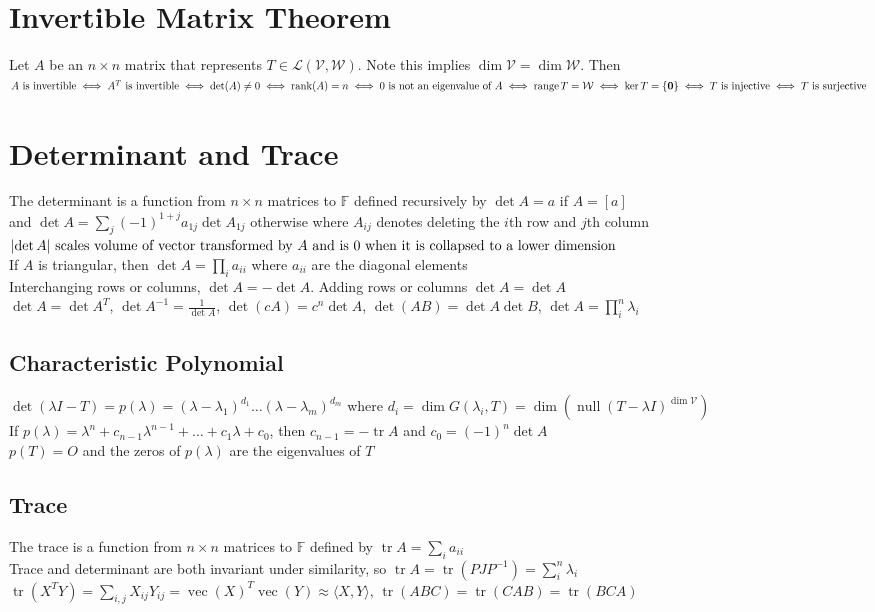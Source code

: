 \documentclass{article}
\DeclarePairedDelimiter\abs{\lvert}{\rvert}%
\DeclareMathOperator{\rank}{rank}
\DeclareMathOperator{\range}{range}
\DeclareMathOperator{\nullspace}{null}
\DeclareMathOperator{\tr}{tr}
\DeclareMathOperator{\vect}{vec}
\newcommand{\F}{\mathbb{F}}
\newcommand{\linear}{\mathcal{L}}
\newcommand{\V}{\mathcal{V}}
\newcommand{\W}{\mathcal{W}}
\newcommand\inner[2]{\langle #1, #2 \rangle}
\begin{document}
\section{Invertible Matrix Theorem}
Let $A$ be an $n \times n$ matrix that represents $T \in \linear(\V, \W)$. Note this implies $\dim \V = \dim \W$. Then \\
$A \mbox{ is invertible} \iff A^T \mbox{ is invertible} \iff \det(A) \neq 0 \iff \rank(A) = n \iff 0 \mbox{ is not an eigenvalue of } A \\ \iff \range T = \W \iff \ker T = \{ \boldsymbol{0} \} \iff T \mbox{ is injective} \iff T \mbox{ is surjective}$

\section{Determinant and Trace}
The determinant is a function from $n \times n$ matrices to $\F$ defined recursively by $\det A = a$ if $A = [a]$ \\ 
and $\det A = \sum_j (-1)^{1+j}a_{1j} \det A_{1j}$ otherwise where $A_{ij}$ denotes deleting the $i$th row and $j$th column \\
$\abs {\det A} \mbox{ scales volume of vector transformed by $A$ and is 0 when it is collapsed to a lower dimension}$ \\
If $A$ is triangular, then $\det A = \prod_i a_{ii}$ where $a_{ii}$ are the diagonal elements \\
Interchanging rows or columns, $\det A = - \det A$. Adding rows or columns $\det A = \det A$ \\
$\det A = \det A^T$, $\det A^{-1} = \frac{1}{\det A}$, $\det (cA) = c^n \det A$, $\det (AB) = \det A \det B$, $\det A = \prod_i^n \lambda_i $ 

\subsection{Characteristic Polynomial}
$\det(\lambda I - T) = p(\lambda) = (\lambda-\lambda_1)^{d_1} \ldots (\lambda-\lambda_m)^{d_m}$ where $d_i = \dim G(\lambda_i, T) = \dim (\nullspace (T- \lambda I)^{\dim \V})$ \\
If $p(\lambda) = \lambda^n + c_{n-1}\lambda^{n-1} + \ldots + c_1\lambda + c_0$, then $c_{n-1} = -\tr A$ and $c_0 = (-1)^n \det A$ \\
$p(T) = O$ and the zeros of $p(\lambda)$ are the eigenvalues of $T$
\subsection{Trace}
The trace is a function from $n \times n$ matrices to $\F$ defined by $\tr A = \sum_i a_{ii}$ \\
Trace and determinant are both invariant under similarity, so $\tr A =  \tr (PJP^{-1}) = \sum_i^n \lambda_i $ \\
$\tr (X^TY) = \sum_{i, j} X_{ij}Y_{ij} = \vect (X)^T \vect(Y) \approx \inner{X}{Y}$, $\tr (ABC) = \tr(CAB) = \tr(BCA)$ 
\end{document}

